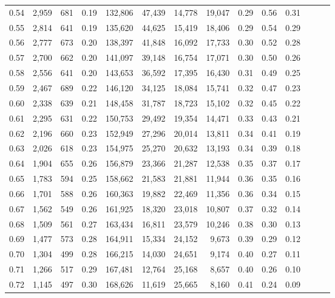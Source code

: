 \begin{tabular}{rrrrrrrrrrrrrr}
0.54 &  2,959 &  681 &  0.19 &  132,806 &   47,439 &  14,778 &  19,047 &  0.29 &  0.56 &      0.31 \\
0.55 &  2,814 &  641 &  0.19 &  135,620 &   44,625 &  15,419 &  18,406 &  0.29 &  0.54 &      0.29 \\
0.56 &  2,777 &  673 &  0.20 &  138,397 &   41,848 &  16,092 &  17,733 &  0.30 &  0.52 &      0.28 \\
0.57 &  2,700 &  662 &  0.20 &  141,097 &   39,148 &  16,754 &  17,071 &  0.30 &  0.50 &      0.26 \\
0.58 &  2,556 &  641 &  0.20 &  143,653 &   36,592 &  17,395 &  16,430 &  0.31 &  0.49 &      0.25 \\
0.59 &  2,467 &  689 &  0.22 &  146,120 &   34,125 &  18,084 &  15,741 &  0.32 &  0.47 &      0.23 \\
0.60 &  2,338 &  639 &  0.21 &  148,458 &   31,787 &  18,723 &  15,102 &  0.32 &  0.45 &      0.22 \\
0.61 &  2,295 &  631 &  0.22 &  150,753 &   29,492 &  19,354 &  14,471 &  0.33 &  0.43 &      0.21 \\
0.62 &  2,196 &  660 &  0.23 &  152,949 &   27,296 &  20,014 &  13,811 &  0.34 &  0.41 &      0.19 \\
0.63 &  2,026 &  618 &  0.23 &  154,975 &   25,270 &  20,632 &  13,193 &  0.34 &  0.39 &      0.18 \\
0.64 &  1,904 &  655 &  0.26 &  156,879 &   23,366 &  21,287 &  12,538 &  0.35 &  0.37 &      0.17 \\
0.65 &  1,783 &  594 &  0.25 &  158,662 &   21,583 &  21,881 &  11,944 &  0.36 &  0.35 &      0.16 \\
0.66 &  1,701 &  588 &  0.26 &  160,363 &   19,882 &  22,469 &  11,356 &  0.36 &  0.34 &      0.15 \\
0.67 &  1,562 &  549 &  0.26 &  161,925 &   18,320 &  23,018 &  10,807 &  0.37 &  0.32 &      0.14 \\
0.68 &  1,509 &  561 &  0.27 &  163,434 &   16,811 &  23,579 &  10,246 &  0.38 &  0.30 &      0.13 \\
0.69 &  1,477 &  573 &  0.28 &  164,911 &   15,334 &  24,152 &   9,673 &  0.39 &  0.29 &      0.12 \\
0.70 &  1,304 &  499 &  0.28 &  166,215 &   14,030 &  24,651 &   9,174 &  0.40 &  0.27 &      0.11 \\
0.71 &  1,266 &  517 &  0.29 &  167,481 &   12,764 &  25,168 &   8,657 &  0.40 &  0.26 &      0.10 \\
0.72 &  1,145 &  497 &  0.30 &  168,626 &   11,619 &  25,665 &   8,160 &  0.41 &  0.24 &      0.09 \\

\end{tabular}
